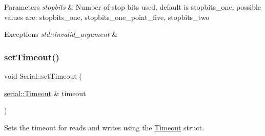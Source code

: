 \begin{DoxyParams}{Parameters}
{\em stopbits} & Number of stop bits used, default is stopbits\+\_\+one, possible values are\+: stopbits\+\_\+one, stopbits\+\_\+one\+\_\+point\+\_\+five, stopbits\+\_\+two\\
\hline
\end{DoxyParams}

\begin{DoxyExceptions}{Exceptions}
{\em std\+::invalid\+\_\+argument} & \\
\hline
\end{DoxyExceptions}
\mbox{\label{classserial_1_1_serial_a4fc63af4b800a9f9e757414f38f3e8b3}} 
\subsubsection{\texorpdfstring{set\+Timeout()}{setTimeout()}\hspace{0.1cm}{\footnotesize\ttfamily [1/2]}}
{\footnotesize\ttfamily void Serial\+::set\+Timeout (\begin{DoxyParamCaption}\item[{\mbox{\hyperlink{structserial_1_1_timeout}{serial\+::\+Timeout}} \&}]{timeout }\end{DoxyParamCaption})}

Sets the timeout for reads and writes using the \mbox{\hyperlink{structserial_1_1_timeout}{Timeout}} struct.

